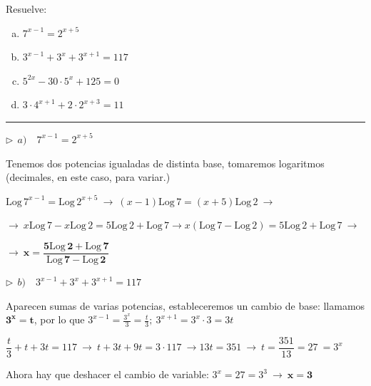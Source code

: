 \begin{miejercicio}

Resuelve: 
\begin{multicols}{2}
  \begin{enumerate}[a) ]
	\item $7^{x-1}=2^{x+5}$

	\item $3^{x-1}+3^x+3^{x+1}=117$

	\item $5^{2x}-30\cdot 5^x+125=0$ 	

	\item $3\cdot 4^{x+1}+2\cdot 2^{x+3}=11$
  \end{enumerate}
\end{multicols}

\rule{250pt}{0.1pt}

\vspace{2mm} $\triangleright \ \ a)\quad 7^{x-1}=2^{x+5}$

\vspace{2mm} Tenemos dos potencias igualadas de distinta base, tomaremos logaritmos (decimales, en este caso, para variar.)

\vspace{2mm} $\mathrm{Log} \, 7^{x-1}=\mathrm{Log} \, 2^{x+5} \ \to \ (x-1) \mathrm{Log} \, 7 = (x+5) \mathrm{Log} \, 2 \ \to \ $

\vspace{2mm}$\to \ x\mathrm{Log}\, 7 -x\mathrm{Log}\, 2=5\mathrm{Log} \, 2+\mathrm{Log}\,7 \to  x(\mathrm{Log}\, 7 -\mathrm{Log}\, 2)=5\mathrm{Log} \, 2+\mathrm{Log}\,7 \ \to \ $
 
\vspace{2mm} $\to \ \boldsymbol{x=\dfrac{5\mathrm{Log} \, 2+\mathrm{Log}\,7}{\mathrm{Log}\, 7 -\mathrm{Log}\, 2}}$



\vspace{5mm} $\triangleright \ \ b)\quad 3^{x-1}+3^x+3^{x+1}=117$

\vspace{2mm} Aparecen sumas de varias potencias, estableceremos un cambio de base: llamamos $\boldsymbol{3^x=t}$, por lo que $3^{x-1}=\frac {3^x}3=\frac t 3;\ 3^{x+1}=3^x\cdot 3=3t$

\vspace{2mm} $\dfrac t 3 +t+3t=117 \ \to \ t+3t+9t=3\cdot 117 \ \to 13t=351 \ \to \ t=\dfrac{351}{13}=27\ = 3^x$

\vspace{2mm} Ahora hay que deshacer el cambio de variable: $3^x=27=3^3 \ \to \ \boldsymbol{x=3}$


\end{miejercicio}

